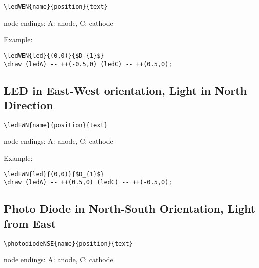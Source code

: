 \documentclass[parskip=full]{scrartcl}
\begin{document}
\begin{verbatim}
\ledWEN{name}{position}{text}
\end{verbatim}
node endings: A: anode, C: cathode

Example:\\
\begin{minipage}{0.8\textwidth}
\begin{verbatim}
\ledWEN{led}{(0,0)}{$D_{1}$}
\draw (ledA) -- ++(-0.5,0) (ledC) -- ++(0.5,0);
\end{verbatim}
\end{minipage}
\begin{minipage}{0.19\textwidth}
\end{minipage}

\subsection{LED in East-West orientation, Light in North Direction}

\begin{verbatim}
\ledEWN{name}{position}{text}
\end{verbatim}
node endings: A: anode, C: cathode

Example:\\
\begin{minipage}{0.8\textwidth}
\begin{verbatim}
\ledEWN{led}{(0,0)}{$D_{1}$}
\draw (ledA) -- ++(0.5,0) (ledC) -- ++(-0.5,0);
\end{verbatim}
\end{minipage}
\begin{minipage}{0.19\textwidth}
\end{minipage}

\subsection{Photo Diode in North-South Orientation, Light from East}

\begin{verbatim}
\photodiodeNSE{name}{position}{text}
\end{verbatim}
node endings: A: anode, C: cathode
\end{document}
